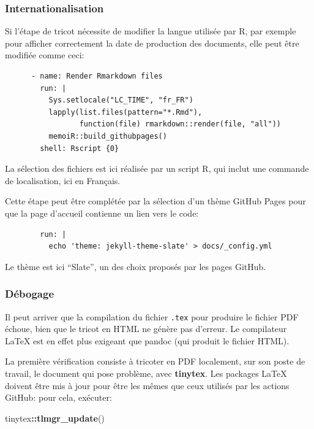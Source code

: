 \documentclass[
  12pt,
  french,
  a4paper,
  extrafontsizes,onecolumn,openright
  ]{memoir}
\newenvironment{Shaded}{\begin{snugshade}}{\end{snugshade}}
\newcommand{\FunctionTok}[1]{\textcolor[rgb]{0.13,0.29,0.53}{\textbf{#1}}}
\newcommand{\NormalTok}[1]{#1}
\newcommand{\SpecialCharTok}[1]{\textcolor[rgb]{0.81,0.36,0.00}{\textbf{#1}}}
\begin{document}
\subsubsection{Internationalisation}\label{internationalisation}

Si l'étape de tricot nécessite de modifier la langue utilisée par R, par exemple pour afficher correctement la date de production des documents, elle peut être modifiée comme ceci:

\begin{verbatim}
      - name: Render Rmarkdown files
        run: |
          Sys.setlocale("LC_TIME", "fr_FR")
          lapply(list.files(pattern="*.Rmd"), 
                 function(file) rmarkdown::render(file, "all"))
          memoiR::build_githubpages()
        shell: Rscript {0}
\end{verbatim}

La sélection des fichiers est ici réalisée par un script R, qui inclut une commande de localisation, ici en Français.

Cette étape peut être complétée par la sélection d'un thème GitHub Pages pour que la page d'accueil contienne un lien vers le code:

\begin{verbatim}
        run: |
          echo 'theme: jekyll-theme-slate' > docs/_config.yml
\end{verbatim}

Le thème est ici \enquote{Slate}, un des choix proposés par les pages GitHub.

\subsubsection{Débogage}\label{duxe9bogage}

Il peut arriver que la compilation du fichier \texttt{.tex} pour produire le fichier PDF échoue, bien que le tricot en HTML ne génère pas d'erreur.
Le compilateur LaTeX est en effet plus exigeant que pandoc (qui produit le fichier HTML).

La première vérification consiste à tricoter en PDF localement, sur son poste de travail, le document qui pose problème, avec \textbf{tinytex}.
Les packages LaTeX doivent être mis à jour pour être les mêmes que ceux utilisés par les actions GitHub: pour cela, exécuter:

\scriptsize

\begin{Shaded}
\begin{Highlighting}[]
\NormalTok{tinytex}\SpecialCharTok{::}\FunctionTok{tlmgr\_update}\NormalTok{()}
\end{Highlighting}
\end{Shaded}
\end{document}
